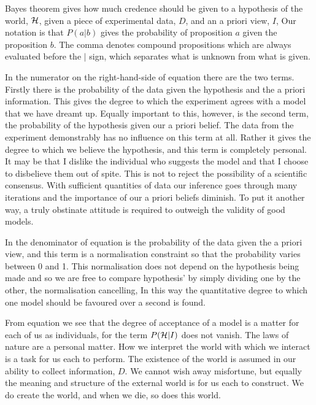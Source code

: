 Bayes theorem gives how much credence should be given to a hypothesis of
the world, ${\cal H}$,
given a piece of experimental data, $D$, and an a priori view, $I$,
Our notation is that $P(a|b)$ gives the probability of proposition $a$
given the proposition
$b$.
The comma denotes compound propositions which are always evaluated
before the $|$ sign, which separates what is unknown from what is given.


In the numerator on the right-hand-side of equation  there are the
two terms.
Firstly there is the  probability of the data given the hypothesis and the a
priori information.
This gives the degree to which the experiment agrees with a model that
we have dreamt up.
Equally important to this, however,
is the second term, 
the probability of the hypothesis given our a priori belief.
The data from the experiment demonstrably has no influence
on this term at all.
Rather it gives the degree to which we believe the hypothesis,
and this term is completely personal.
It may be that I dislike the individual who suggests the model and that I
choose to disbelieve them out of spite.
This is not to reject the possibility of a scientific consensus.
With sufficient quantities of data our inference goes through many
iterations and the importance of our a priori beliefs diminish.
To put it another way,
a truly obstinate attitude is required to outweigh the validity of
good models.

In the denominator of equation  is  the probability of the data given the a priori view,
and this term is a normalisation constraint so that the  probability varies between
0 and 1.
This normalisation does not depend on the hypothesis being made and so
we are free to compare hypothesis' by simply dividing one by the
other, 
the normalisation cancelling,
In this way the quantitative degree to which one model should be favoured
over a second is found.

From equation  we see that the degree of acceptance
of a model is a matter for 
each of us as individuals, for 
the term $P({\cal H}|I)$ does not vanish.
The laws of nature are a personal matter.
How we interpret the  world with which we interact is a task for
us each to perform.
The existence of the world is assumed in our ability to
collect information, $D$.
We cannot wish away misfortune,
but equally the meaning and structure of the external world is for us each
to construct. 
We do create the world, 
and when we die, so does this world. %

